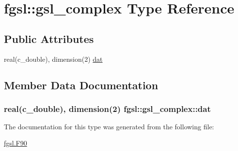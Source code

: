 \hypertarget{structfgsl_1_1gsl__complex}{\section{fgsl\-:\-:gsl\-\_\-complex Type Reference}
\label{structfgsl_1_1gsl__complex}
}
\subsection*{Public Attributes}
\begin{DoxyCompactItemize}
\item 
real(c\-\_\-double), dimension(2) \hyperlink{structfgsl_1_1gsl__complex_a50388c80381b51ae88a07ed9726edf27}{dat}
\end{DoxyCompactItemize}


\subsection{Member Data Documentation}
\hypertarget{structfgsl_1_1gsl__complex_a50388c80381b51ae88a07ed9726edf27}{
\subsubsection[{dat}]{\setlength{\rightskip}{0pt plus 5cm}real(c\-\_\-double), dimension(2) fgsl\-::gsl\-\_\-complex\-::dat}}\label{structfgsl_1_1gsl__complex_a50388c80381b51ae88a07ed9726edf27}


The documentation for this type was generated from the following file\-:\begin{DoxyCompactItemize}
\item 
\hyperlink{fgsl_8F90}{fgsl.\-F90}\end{DoxyCompactItemize}
